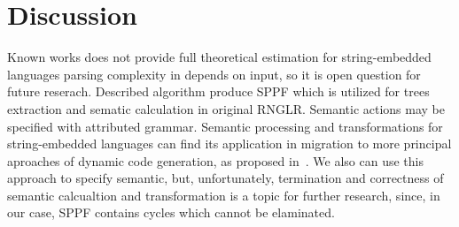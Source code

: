 \section{Discussion}
%
Known works does not provide full theoretical estimation for string-embedded languages parsing complexity in depends on input, so it is open question for future reserach.
Described algorithm produce SPPF which is utilized for trees extraction and sematic calculation in original RNGLR. Semantic actions may be specified with attributed grammar.
Semantic processing and transformations for string-embedded languages can find its application in migration to more principal aproaches of dynamic code generation, as proposed in~\cite{EvalToStaged}.
We also can use this approach to specify semantic, but, unfortunately, termination and correctness of semantic calcualtion and transformation is a topic for further research, 
since, in our case, SPPF contains cycles which cannot be elaminated. 

